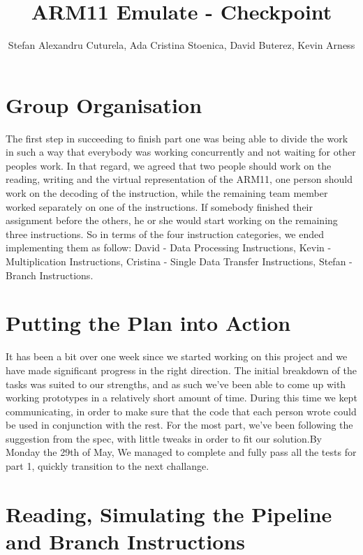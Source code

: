 \documentclass[11pt]{article}
\begin{document}
\title{ARM11 Emulate - Checkpoint }
\author{Stefan Alexandru Cuturela, Ada Cristina Stoenica, David Buterez, Kevin Arness}

\maketitle

\section{Group Organisation}

The first step in succeeding to finish part one was being able to divide the work in such a way that
everybody was working concurrently and not waiting for other peoples work. In that regard, we agreed that
two people should work on the reading, writing and the virtual representation of the ARM11, one person should work
on the decoding of the instruction, while the remaining team member worked separately on one of the instructions.
If somebody finished their assignment before the others, he or she would start working on the remaining three instructions.
So in terms of the four instruction categories, we ended implementing them as follow: David - Data Processing Instructions,
Kevin -Multiplication Instructions, Cristina - Single Data Transfer Instructions, Stefan - Branch Instructions.

\section{Putting the Plan into Action}

It has been a bit over one week since we started working on this project and we have made significant progress
in the right direction. The initial breakdown of the tasks was suited to our strengths, and as such we’ve been able to come
up with working prototypes in a relatively short amount of time. During this time we kept communicating, in order to make
sure that the code that each person wrote could be used in conjunction with the rest. For the most part, we’ve been
following the suggestion from the spec, with little tweaks in order to fit our solution.By Monday the 29th of May,
We managed to complete and fully pass all the tests for part 1, quickly transition to the next challange.

\section{Reading, Simulating the Pipeline and Branch Instructions}
\end{document}
